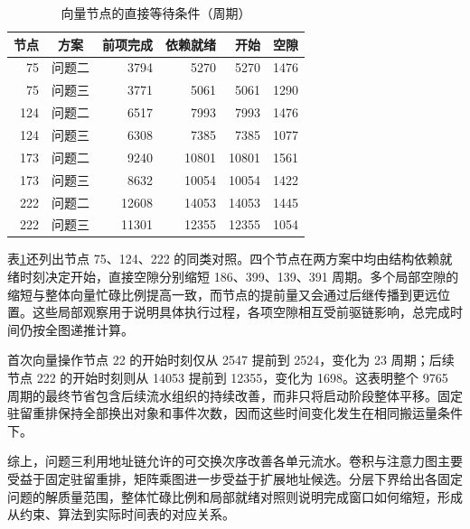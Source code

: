 \begin{table}[H]\centering\small
\caption{向量节点的直接等待条件（周期）}\label{tab:waits}
\begin{tabular}{rcrrrr}\toprule
节点&方案&前项完成&依赖就绪&开始&空隙\\\midrule
75&问题二&3794&5270&5270&1476\\
75&问题三&3771&5061&5061&1290\\
124&问题二&6517&7993&7993&1476\\
124&问题三&6308&7385&7385&1077\\
173&问题二&9240&10801&10801&1561\\
173&问题三&8632&10054&10054&1422\\
222&问题二&12608&14053&14053&1445\\
222&问题三&11301&12355&12355&1054\\\bottomrule
\end{tabular}\end{table}

表\ref{tab:waits}还列出节点 75、124、222 的同类对照。四个节点在两方案中均由结构依赖就绪时刻决定开始，直接空隙分别缩短 186、399、139、391 周期。多个局部空隙的缩短与整体向量忙碌比例提高一致，而节点的提前量又会通过后继传播到更远位置。这些局部观察用于说明具体执行过程，各项空隙相互受前驱链影响，总完成时间仍按全图递推计算。

首次向量操作节点 22 的开始时刻仅从 2547 提前到 2524，变化为 23 周期；后续节点 222 的开始时刻则从 14053 提前到 12355，变化为 1698。这表明整个 9765 周期的最终节省包含后续流水组织的持续改善，而非只将启动阶段整体平移。固定驻留重排保持全部换出对象和事件次数，因而这些时间变化发生在相同搬运量条件下。

综上，问题三利用地址链允许的可交换次序改善各单元流水。卷积与注意力图主要受益于固定驻留重排，矩阵乘图进一步受益于扩展地址候选。分层下界给出各固定问题的解质量范围，整体忙碌比例和局部就绪对照则说明完成窗口如何缩短，形成从约束、算法到实际时间表的对应关系。
